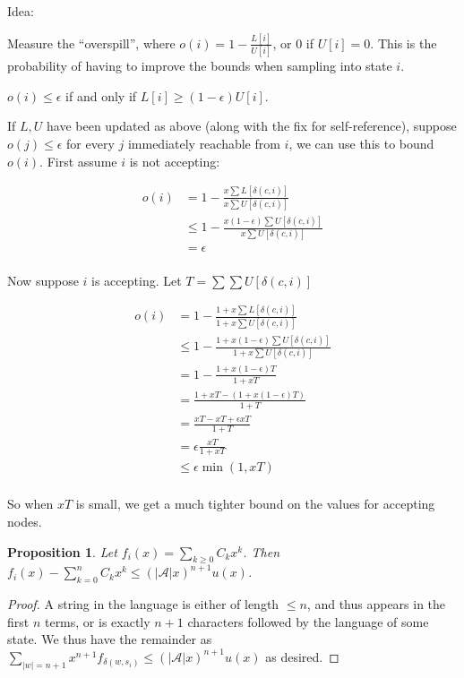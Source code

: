 \documentclass[a4paper]{book}
\newtheorem{proposition}{Proposition}[section]
\begin{document}
Idea:

Measure the ``overspill'', where \(o(i) = 1 - \frac{L[i]}{U[i]}\), or \(0\) if \(U[i] = 0\).
This is the probability of having to improve the bounds when sampling into state \(i\).

\(o(i) \leq \epsilon\) if and only if \(L[i] \geq (1 - \epsilon)U[i]\).

If \(L, U\) have been updated as above (along with the fix for self-reference),
suppose \(o(j) \leq \epsilon\) for every \(j\) immediately reachable from \(i\),
we can use this to bound \(o(i)\).
First assume \(i\) is not accepting:

\begin{align*}
o(i) &= 1 - \frac{x \sum L[\delta(c, i)]}{x \sum U[\delta(c, i)]} \\
&\leq 1 - \frac{x (1 - \epsilon) \sum U[\delta(c, i)]}{x \sum U[\delta(c, i)]} \\
&= \epsilon\\
\end{align*}

Now suppose \(i\) is accepting.
Let \(T = \sum \sum U[\delta(c, i)]\)

\begin{align*}
o(i) &= 1 - \frac{1 + x \sum L[\delta(c, i)]}{1 + x \sum U[\delta(c, i)]} \\
&\leq 1 - \frac{1 + x (1 - \epsilon) \sum U[\delta(c, i)]}{1 + x \sum U[\delta(c, i)]} \\
&= 1 - \frac{1 + x (1 - \epsilon) T}{1 + x T}\\
&= \frac{1 + x T - (1 + x (1 - \epsilon) T)}{1 + T}\\
&= \frac{x T - x T + \epsilon x T}{1 + T}\\
&= \epsilon \frac{x T}{1 + x T}\\
&\leq \epsilon \min(1, xT)\\
\end{align*}

So when \(xT\) is small,
we get a much tighter bound on the values for accepting nodes.

\begin{proposition}
Let \(f_i(x) = \sum\limits_{k \geq 0} C_k x^k\).
Then \(f_i(x) - \sum\limits_{k = 0}^n C_k x^k \leq {(|\mathcal{A}|x)}^{n + 1} u(x)\).
\end{proposition}

\begin{proof}
A string in the language is either of length \(\leq n\),
and thus appears in the first \(n\) terms,
or is exactly \(n + 1\) characters followed by the language of some state.
We thus have the remainder as \(\sum\limits_{|w| = n + 1} x^{n + 1} f_{\delta(w, s_i)} \leq {(|\mathcal{A}|x)}^{n + 1} u(x)\) as desired.
\end{proof}
\end{document}
